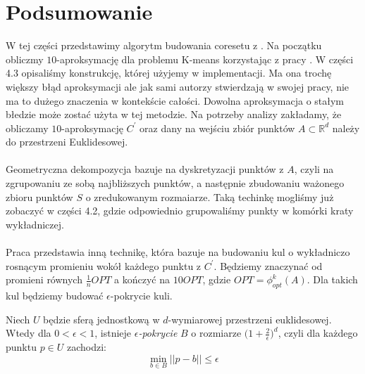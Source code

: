\section{Podsumowanie}

W tej części przedstawimy algorytm budowania coresetu z \cite{DBLP:journals/ki/MunteanuS18}.
Na początku obliczmy $10$-aproksymację dla problemu K-means korzystając z pracy \cite{Arya2004LocalSH}.
W części 4.3 opisaliśmy konstrukcję, której użyjemy w implementacji.
Ma ona trochę większy błąd aproksymacji ale jak sami autorzy \cite{DBLP:journals/ki/MunteanuS18} stwierdzają w swojej pracy, nie ma to dużego znaczenia w kontekście całości.
Dowolna aproksymacja o stałym błedzie może zostać użyta w tej metodzie.
Na potrzeby analizy zakładamy, że obliczamy $10$-aproksymację $C^{'}$ oraz dany na wejściu zbiór punktów $A \subset \mathbb{R}^d$ należy do przestrzeni Euklidesowej.
\\~\\
Geometryczna dekompozycja bazuje na dyskretyzacji punktów z $A$, czyli na zgrupowaniu ze sobą najbliższych punktów, a następnie zbudowaniu ważonego zbioru punktów $S$ o zredukowanym rozmaiarze.
Taką techinkę mogliśmy już zobaczyć w części 4.2, gdzie odpowiednio grupowaliśmy punkty w komórki kraty wykładniczej.
\\~\\
Praca \cite{DBLP:journals/ki/MunteanuS18} przedstawia inną technikę, która bazuje na budowaniu kul o wykładniczo rosnącym promieniu wokół każdego punktu z $C^{'}$.
Będziemy znaczynać od promieni równych $\frac{1}{n}OPT$ a kończyć na $10 OPT$, gdzie $OPT = \phi_{opt}^{k}(A)$.
Dla takich kul będziemy budować $\epsilon$-pokrycie kuli.

\begin{lemma}{\cite{pisier_1989}}
    Niech $U$ będzie sferą jednostkową w $d$-wymiarowej przestrzeni euklidesowej.
    Wtedy dla $0 < \epsilon < 1$, istnieje \textit{$\epsilon$-pokrycie} $B$ o rozmiarze $\Big(1 +\frac{2}{\epsilon}\Big)^{d}$, czyli dla każdego punktu $p \in U$ zachodzi:
    \begin{equation}
        \min_{b \in B} ||p-b|| \leq \epsilon
    \end{equation}
\end{lemma}


